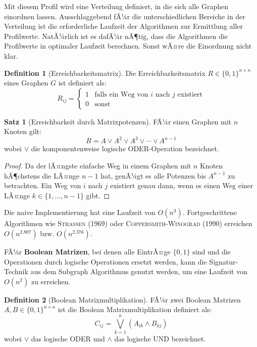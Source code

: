 ﻿\documentclass[a4paper,12pt]{article}
\theoremstyle{definition}
\newtheorem{definition}{Definition}
\newtheorem{satz}{Satz}
\begin{document}
	Mit diesem Profil wird eine Verteilung definiert, in die sich alle Graphen einordnen lassen. Ausschlaggebend fÃ¼r die unterschiedlichen Bereiche in der Verteilung ist die erforderliche Laufzeit der Algorithmen zur Ermittlung aller Profilwerte. NatÃ¼rlich ist es dafÃ¼r nÃ¶tig, dass die Algorithmen die Profilwerte in optimaler Laufzeit berechnen. Sonst wÃ¤re die Einordnung nicht klar.
	
	\begin{definition}[Erreichbarkeitsmatrix]
		Die Erreichbarkeitsmatrix $R \in \{0,1\}^{n \times n}$ eines Graphen $G$ ist definiert als:
		\[
		R_{ij} = \begin{cases} 1 & \text{falls ein Weg von } i \text{ nach } j \text{ existiert} \\ 0 & \text{sonst} \end{cases}
		\]
	\end{definition}
	
	\begin{satz}[Erreichbarkeit durch Matrixpotenzen]
		FÃ¼r einen Graphen mit $n$ Knoten gilt:
		\[
		R = A \vee A^2 \vee A^3 \vee \cdots \vee A^{n-1}
		\]
		wobei $\vee$ die komponentenweise logische ODER-Operation bezeichnet.
	\end{satz}
	
	\begin{proof}
		Da der lÃ¤ngste einfache Weg in einem Graphen mit $n$ Knoten hÃ¶chstens die LÃ¤nge $n-1$ hat, genÃ¼gt es alle Potenzen bis $A^{n-1}$ zu betrachten. Ein Weg von $i$ nach $j$ existiert genau dann, wenn es einen Weg einer LÃ¤nge $k \in \{1, \ldots, n-1\}$ gibt.
	\end{proof}
	
	Die naive Implementierung hat eine Laufzeit von $O(n^3)$. Fortgeschrittene Algorithmen wie \textsc{Strassen} (1969) oder \textsc{Coppersmith-Winograd} (1990) erreichen $O(n^{2.807})$ bzw. $O(n^{2.376})$.
	
	FÃ¼r \textbf{Boolean Matrizen}, bei denen alle EintrÃ¤ge $\{0, 1\}$ sind und die Operationen durch logische Operationen ersetzt werden, kann die Signatur-Technik aus dem Subgraph Algorithmus genutzt werden, um eine Laufzeit von $O(n^2)$ zu erreichen.
	
	\begin{definition}[Boolean Matrixmultiplikation]
		FÃ¼r zwei Boolean Matrizen $A, B \in \{0,1\}^{n \times n}$ ist die Boolean Matrixmultiplikation definiert als:
		\[
		C_{ij} = \bigvee_{k=1}^{n} (A_{ik} \wedge B_{kj})
		\]
		wobei $\vee$ das logische ODER und $\wedge$ das logische UND bezeichnet.
	\end{definition}
	
\end{document}
